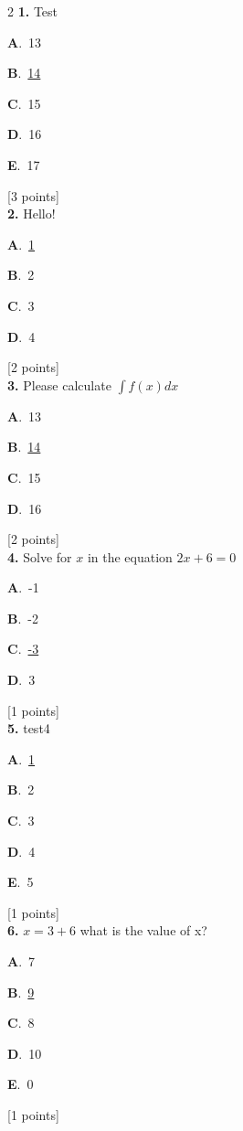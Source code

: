\documentclass[12pt]{article}
\newcommand{\choice}[3]{%
  \noindent\textbf{#1}.~#2\hfill#3\par\vspace{0.25em}
}
\begin{document}
\begin{multicols}{2}
\noindent \textbf{\textenglish{1.}} {\textenglish{Test}}

\noindent\choice{A}{{\textenglish{13}}}{}
\noindent\choice{B}{\underline{{\textenglish{14}}}}{}
\noindent\choice{C}{{\textenglish{15}}}{}
\noindent\choice{D}{{\textenglish{16}}}{}
\noindent\choice{E}{{\textenglish{17}}}{}
\hfill {\textenglish{[3 points]}}\\[0.5em]

\noindent \textbf{\textenglish{2.}} {\textenglish{Hello!}}

\noindent\choice{A}{\underline{{\textenglish{1}}}}{}
\noindent\choice{B}{{\textenglish{2}}}{}
\noindent\choice{C}{{\textenglish{3}}}{}
\noindent\choice{D}{{\textenglish{4}}}{}
\hfill {\textenglish{[2 points]}}\\[0.5em]

\noindent \textbf{\textenglish{3.}} {\textenglish{Please calculate }}\(\int f(x)dx\)

\noindent\choice{A}{{\textenglish{13}}}{}
\noindent\choice{B}{\underline{{\textenglish{14}}}}{}
\noindent\choice{C}{{\textenglish{15}}}{}
\noindent\choice{D}{{\textenglish{16}}}{}
\hfill {\textenglish{[2 points]}}\\[0.5em]

\noindent \textbf{\textenglish{4.}} {\textenglish{Solve for }}\(x \){\textenglish{ in the equation }}\(2x+6 = 0 \)

\noindent\choice{A}{{\textenglish{-1}}}{}
\noindent\choice{B}{{\textenglish{-2}}}{}
\noindent\choice{C}{\underline{{\textenglish{-3}}}}{}
\noindent\choice{D}{{\textenglish{3}}}{}
\hfill {\textenglish{[1 points]}}\\[0.5em]

\noindent \textbf{\textenglish{5.}} {\textenglish{test4}}

\noindent\choice{A}{\underline{{\textenglish{1}}}}{}
\noindent\choice{B}{{\textenglish{2}}}{}
\noindent\choice{C}{{\textenglish{3}}}{}
\noindent\choice{D}{{\textenglish{4}}}{}
\noindent\choice{E}{{\textenglish{5}}}{}
\hfill {\textenglish{[1 points]}}\\[0.5em]

\noindent \textbf{\textenglish{6.}} \(x=3+6 \){\textenglish{ what is the value of x?}}

\noindent\choice{A}{{\textenglish{7}}}{}
\noindent\choice{B}{\underline{{\textenglish{9}}}}{}
\noindent\choice{C}{{\textenglish{8}}}{}
\noindent\choice{D}{{\textenglish{10}}}{}
\noindent\choice{E}{{\textenglish{0}}}{}
\hfill {\textenglish{[1 points]}}\\[0.5em]


\end{multicols}
\end{document}
